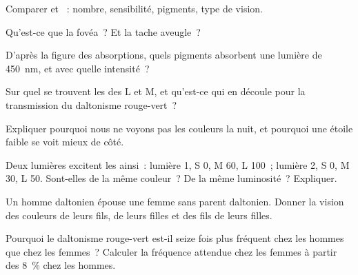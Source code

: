 \begin{exercise}[$\star$]\label{exo:g11:the-eye:2}
Comparer  et ~: nombre, sensibilité, pigments, type de
vision.
\end{exercise}

\begin{exercise}[$\star$]\label{exo:g11:the-eye:3}
Qu'est-ce que la fovéa~? Et la tache aveugle~?
\end{exercise}

\begin{exercise}[$\star$]\label{exo:g11:the-eye:4}
D'après la figure des absorptions, quels pigments absorbent une lumière
de \qty{450}{nm}, et avec quelle intensité~?
\end{exercise}

\begin{exercise}[$\star$]\label{exo:g11:the-eye:5}
Sur quel  se trouvent les  des  L et M, et
qu'est-ce qui en découle pour la transmission du daltonisme
rouge-vert~?
\end{exercise}

\begin{exercise}[$\star\star$]\label{exo:g11:the-eye:6}
Expliquer pourquoi nous ne voyons pas les couleurs la nuit, et pourquoi
une étoile faible se voit mieux de côté.
\end{exercise}

\begin{exercise}[$\star\star$]\label{exo:g11:the-eye:7}
Deux lumières excitent les  ainsi~: lumière 1, S 0, M 60, L 100~;
lumière 2, S 0, M 30, L 50. Sont-elles de la même couleur~? De la même
luminosité~? Expliquer.
\end{exercise}

\begin{exercise}[$\star\star$]\label{exo:g11:the-eye:8}
Un homme daltonien épouse une femme sans parent daltonien. Donner la
vision des couleurs de leurs fils, de leurs filles et des fils de leurs
filles.
\end{exercise}

\begin{exercise}[$\star\star$]\label{exo:g11:the-eye:9}
Pourquoi le daltonisme rouge-vert est-il seize fois plus fréquent chez
les hommes que chez les femmes~? Calculer la fréquence attendue chez
les femmes à partir des 8~\% chez les hommes.
\end{exercise}

